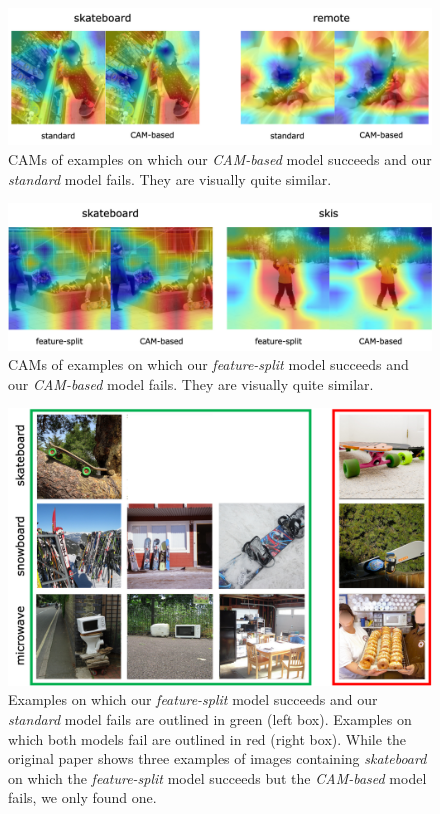 \begin{figure}[h!]
    \centering
    \includegraphics[width=\textwidth]{../openreview/images/figure6.png}
    \caption{CAMs of examples on which our \textit{CAM-based} model succeeds and our \textit{standard} model fails. They are visually quite similar.}
    \label{fig:original_fig6}
\end{figure}

\begin{figure}[h!]
    \centering
    \includegraphics[width=\textwidth]{../openreview/images/fs_not_cam.png}
    \caption{CAMs of examples on which our \textit{feature-split} model succeeds and our \textit{CAM-based} model fails. They are visually quite similar.}
    \label{fig:original_fig7}
\end{figure}

\begin{figure}[h!]
    \centering
    \includegraphics[width=\textwidth]{../openreview/images/figure8.png}
    \caption{Examples on which our \textit{feature-split} model succeeds and our  \textit{standard} model fails are outlined in green (left box). Examples on which both models fail are outlined in red (right box). While the original paper shows three examples of images containing \textit{skateboard} on which the \textit{feature-split} model succeeds but the \textit{CAM-based} model fails, we only found one.}
    \label{fig:original_fig8}
\end{figure}

